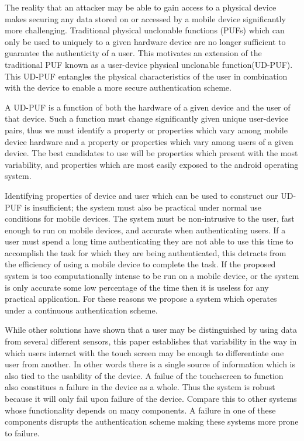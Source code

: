 \documentclass{acm_proc_article-sp}
\begin{document}
The reality that an attacker may be able to gain access to a physical device makes securing any data stored on or accessed by a mobile device significantly more challenging. Traditional physical unclonable functions (PUFs) which can only be used to uniquely to a given hardware device are no longer sufficient to guarantee the authenticity of a user.
%
This motivates an extension of the traditional PUF known as a user-device physical unclonable function(UD-PUF). This UD-PUF entangles the physical characteristics of the user in combination with the device to enable a more secure authentication scheme.

A UD-PUF is a function of both the hardware of a given device and the user of that device. Such a function must change significantly given unique user-device pairs, thus we must identify a property or properties which vary among mobile device hardware and a property or properties which vary among users of a given device. The best candidates to use will be properties which present with the most variability, and properties which are most easily exposed to the android operating system.

Identifying properties of device and user which can be used to construct our UD-PUF is insufficient; the system must also be practical under normal use conditions for mobile devices. The system must be non-intrusive to the user, fast enough to run on mobile devices, and accurate when authenticating users. If a user must spend a long time authenticating they are not able to use this time to accomplish the task for which they are being authenticated, this detracts from the efficiency of using a mobile device to complete the task. If the proposed system is too computationally intense to be run on a mobile device, or the system is only accurate some low percentage of the time then it is useless for any practical application. For these reasons we propose a system which operates under a continuous authentication scheme.

While other solutions have shown that a user may be distinguished by using data from several different sensors, this paper establishes that variability in the way in which users interact with the touch screen may be enough to differentiate one user from another. In other words there is a single source of information which is also tied to the usability of the device. A failue of the touchscreen to function also constitues a failure in the device as a whole. Thus the system is robust because it will only fail upon failure of the device. Compare this to other systems whose functionality depends on many components. A failure in one of these components disrupts the authentication scheme making these systems more prone to failure. 
\end{document}
